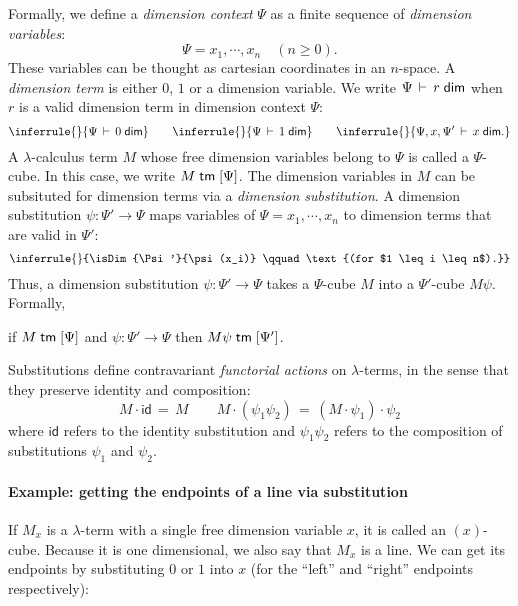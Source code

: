 \documentclass{article}
\newcommand\DimSubst[3]{#3\langle{#1}/{#2}\rangle}
\begin{document}
Formally, we define a \emph{dimension context} $\Psi$ as a finite
sequence of \emph{dimension variables}:
\[ \Psi = x_1, \cdots, x_n \quad (n \geq 0).  \] These variables can
be thought as cartesian coordinates in an $n$-space.  A
\emph{dimension term} is either $0$, $1$ or a dimension variable. We
write $\Psi \,\vdash\, r \;\mathsf{dim}$ when $r$ is a valid dimension term in
dimension context $\Psi$:
\[
  \inferrule{}{\isDim{\Psi}{0}} \qquad \inferrule{}{\isDim{\Psi}{1}}
  \qquad \inferrule{}{\isDim{\Psi, x, \Psi'}{x}.}
\]
A $\lambda$-calculus term $M$ whose free dimension variables belong to
$\Psi$ is called a $\Psi$-cube. In this case, we write
$M \; \mathsf{tm} \; [\Psi]$. The dimension variables in $M$ can be subsituted for
dimension terms via a \emph{dimension substitution}. A dimension
substitution $\psi : \Psi' \to \Psi$ maps variables of
$\Psi = x_1, \cdots, x_n $ to dimension terms that are valid in
$\Psi'$:
\[
  \inferrule{}{\isDim{\Psi'}{\psi(x_i)} \qquad \text{(for
      $1 \leq i \leq n$).}}
\]
Thus, a dimension substitution $\psi : \Psi' \to \Psi$ takes a
$\Psi$-cube $M$ into a $\Psi'$-cube $M \psi$. Formally,
\begin{center}
  if $M \; \mathsf{tm} \; [\Psi]$ and $\psi : \Psi' \to \Psi$ then
  $M \psi \; \mathsf{tm} \; [\Psi']$.
\end{center}
Substitutions define contravariant \emph{functorial actions} on
$\lambda$-terms, in the sense that they preserve identity and
composition:
\[ M \cdot \textsf{id} \,=\, M \qquad M \cdot (\psi_1 \psi_2) \,=\,
  (M \cdot \psi_1) \cdot \psi_2 \] where $\textsf{id}$ refers to the
identity substitution and $\psi_1 \psi_2$ refers to the composition
of substitutions $\psi_1$ and $\psi_2$. 


\paragraph{Example: getting the endpoints of a line via substitution}

If $M_x$ is a $\lambda$-term with a single free dimension variable $x$, it
is called an $(x)$-cube. Because it is one dimensional, we also say that
$M_x$ is a line. We can get its endpoints by substituting $0$ or $1$ into $x$
(for the ``left'' and ``right'' endpoints respectively):

\begin{center}
\end{center}
\end{document}

